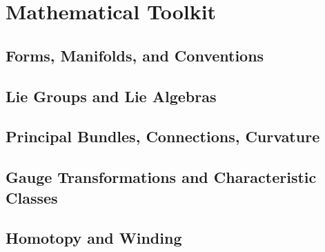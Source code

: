 \section{Mathematical Toolkit}
\label{sec:mathematical-toolkit}


\subsection{Forms, Manifolds, and Conventions}
\label{subsec:forms-conventions}


\subsection{Lie Groups and Lie Algebras}
\label{subsec:lie-groups}


\subsection{Principal Bundles, Connections, Curvature}
\label{subsec:bundles-connections}


\subsection{Gauge Transformations and Characteristic Classes}
\label{subsec:gauge-char-classes}


\subsection{Homotopy and Winding}
\label{subsec:homotopy-winding}

